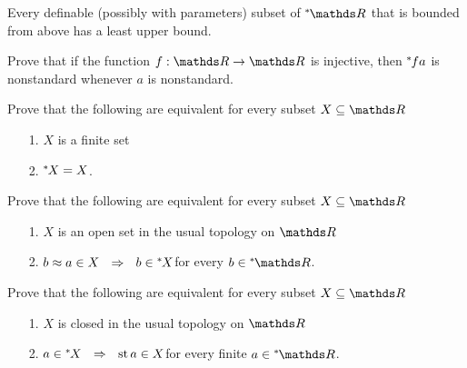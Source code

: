 
\begin{exercise}\label{ex_dedekindcomplete}
  Every definable (possibly with parameters) subset of $\nsR$ that is bounded from above has a least upper bound.
\end{exercise}

\begin{exercise}
  Prove that if the function $f:\RR\to\RR$ is injective, then ${}^*\kern-.2ex f a$ is nonstandard whenever $a$ is nonstandard.
\end{exercise}

\begin{exercise}
  Prove that the following are equivalent for every subset $X\subseteq\RR$\nobreak
  \begin{itemize}
  \item[1.]  $X$ is a finite set
  \item[2.]  ${}^*\kern-.2ex X=X$.
  \end{itemize}
\end{exercise}

\begin{exercise}\label{ex_open_nstd}
  Prove that the following are equivalent for every subset $X\subseteq\RR$\nobreak
  \begin{itemize}
  \item[1.]  $X$ is an open set in the usual topology on $\RR$
  \item[2.]  $b\approx a\in X \ \ \Rightarrow\ \ b\in{}^*\kern-.2ex X$\hfill for every $b\in\nsR$.
  \end{itemize}
\end{exercise}

\begin{exercise}\label{ex_closed_nstd}
  Prove that the following are equivalent for every subset $X\subseteq\RR$\nobreak
  \begin{itemize}
  \item[1.]  $X$ is closed in the usual topology on $\RR$
  \item[2.]  $a\in{}^*\kern-.2ex X \ \ \Rightarrow\ \ {\rm st}\, a\in X$\hfill for every finite $a\in\nsR$.
  \end{itemize}
\end{exercise}

